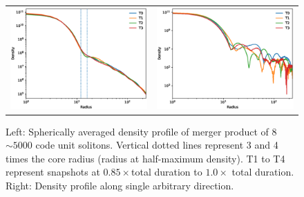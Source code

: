 \documentclass[a4paper,11pt]{article}
\begin{document}
\begin{figure}
\begin{tabular}{cc}
{\includegraphics[scale = 0.55, trim={1.5cm 0 0 1cm}]{pics/combined3.eps}} &
{\includegraphics[scale = 0.55, trim={2cm 0 0 1cm}]{pics/singles.eps}}
\end{tabular}
\caption{Left: Spherically averaged density profile of merger product of 8 $\sim 5000$ code unit solitons. Vertical dotted lines represent 3 and 4 times the core radius (radius at half-maximum density). T1 to T4 represent snapshots at $0.85\times$total duration to $1.0 \times$ total duration. 
Right: Density profile along single arbitrary direction.}\label{fig:pul}
\end{figure}
\end{document}

